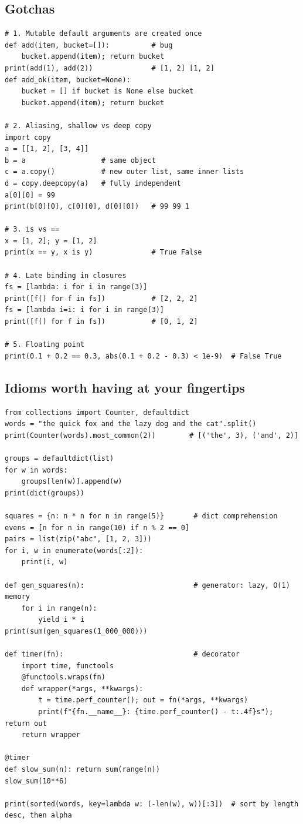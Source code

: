 \subsection{Gotchas}
\begin{lstlisting}[style=python]
# 1. Mutable default arguments are created once
def add(item, bucket=[]):          # bug
    bucket.append(item); return bucket
print(add(1), add(2))              # [1, 2] [1, 2]
def add_ok(item, bucket=None):
    bucket = [] if bucket is None else bucket
    bucket.append(item); return bucket

# 2. Aliasing, shallow vs deep copy
import copy
a = [[1, 2], [3, 4]]
b = a                  # same object
c = a.copy()           # new outer list, same inner lists
d = copy.deepcopy(a)   # fully independent
a[0][0] = 99
print(b[0][0], c[0][0], d[0][0])   # 99 99 1

# 3. is vs ==
x = [1, 2]; y = [1, 2]
print(x == y, x is y)              # True False

# 4. Late binding in closures
fs = [lambda: i for i in range(3)]
print([f() for f in fs])           # [2, 2, 2]
fs = [lambda i=i: i for i in range(3)]
print([f() for f in fs])           # [0, 1, 2]

# 5. Floating point
print(0.1 + 0.2 == 0.3, abs(0.1 + 0.2 - 0.3) < 1e-9)  # False True
\end{lstlisting}

\subsection{Idioms worth having at your fingertips}
\begin{lstlisting}[style=python]
from collections import Counter, defaultdict
words = "the quick fox and the lazy dog and the cat".split()
print(Counter(words).most_common(2))        # [('the', 3), ('and', 2)]

groups = defaultdict(list)
for w in words:
    groups[len(w)].append(w)
print(dict(groups))

squares = {n: n * n for n in range(5)}       # dict comprehension
evens = [n for n in range(10) if n % 2 == 0]
pairs = list(zip("abc", [1, 2, 3]))
for i, w in enumerate(words[:2]):
    print(i, w)

def gen_squares(n):                          # generator: lazy, O(1) memory
    for i in range(n):
        yield i * i
print(sum(gen_squares(1_000_000)))

def timer(fn):                               # decorator
    import time, functools
    @functools.wraps(fn)
    def wrapper(*args, **kwargs):
        t = time.perf_counter(); out = fn(*args, **kwargs)
        print(f"{fn.__name__}: {time.perf_counter() - t:.4f}s"); return out
    return wrapper

@timer
def slow_sum(n): return sum(range(n))
slow_sum(10**6)

print(sorted(words, key=lambda w: (-len(w), w))[:3])  # sort by length desc, then alpha
\end{lstlisting}

